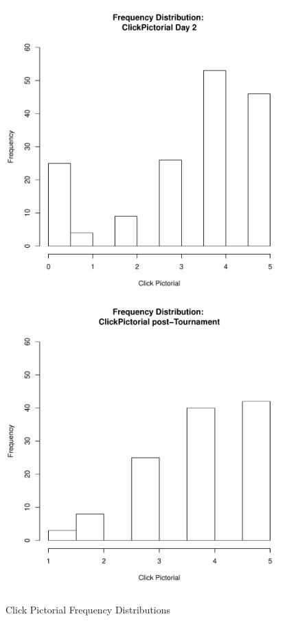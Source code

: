 \documentclass[12pt]{report}
\begin{document}
{\begin{figure}[htbp]
  \includegraphics[scale =.4]{../images/distClickPictorialDay2.pdf}
  \includegraphics[scale =.4]{../images/distClickPictorialPost.pdf}
  \caption{Click Pictorial Frequency Distributions}
  \label{fig:clickPictorialDist}
\end{figure}


}
\end{document}
